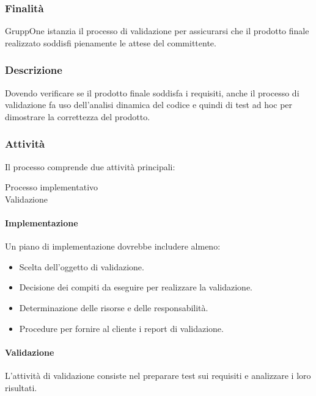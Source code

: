 \documentclass[../../norme-di-progetto.tex]{subfiles}
\begin{document}
\subsubsection{Finalità}%
\label{subs:validazione/finalita}

GruppOne istanzia il processo di validazione per assicurarsi che il prodotto finale realizzato soddisfi pienamente le attese del committente.

\subsubsection{Descrizione}%
\label{subs:validazione/descrizione}

Dovendo verificare se il prodotto finale soddisfa i requisiti, anche il processo di validazione fa uso dell'analisi dinamica del codice e quindi di test ad hoc per dimostrare la correttezza del prodotto.

\subsubsection{Attività}%
\label{subs:attivita}

Il processo comprende due attività principali:

\begin{description}
\item [Processo implementativo]
\item [Validazione]
\end{description}

\paragraph{Implementazione}%
\label{subs:implementazione}
Un piano di implementazione dovrebbe includere almeno:
\begin{itemize}
  \item Scelta dell'oggetto di validazione.
  \item Decisione dei compiti da eseguire per realizzare la validazione.
  \item Determinazione delle risorse e delle responsabilità.
  \item Procedure per fornire al cliente i report di validazione.
\end{itemize}

\paragraph{Validazione}
L'attività di validazione consiste nel preparare test sui requisiti e analizzare i loro risultati.
\end{document}
